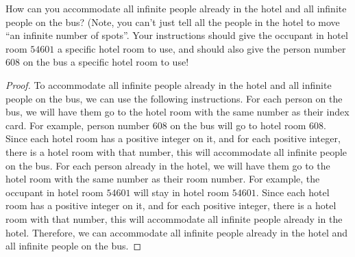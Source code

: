 \documentclass{article}
\begin{document}
\begin{enumerate}
How can you accommodate all infinite people already in the hotel and all infinite people on the bus? (Note, you can't just tell all the people in the hotel to move ``an infinite number of spots''. Your instructions should give the occupant in hotel room $54601$ a specific hotel room to use, and should also give the person number $608$ on the bus a specific hotel room to use!

\begin{proof}
    To accommodate all infinite people already in the hotel and all infinite people on the bus, we can use the following instructions. For each person on the bus, we will have them go to the hotel room with the same number as their index card. For example, person number $608$ on the bus will go to hotel room $608$. Since each hotel room has a positive integer on it, and for each positive integer, there is a hotel room with that number, this will accommodate all infinite people on the bus. For each person already in the hotel, we will have them go to the hotel room with the same number as their room number. For example, the occupant in hotel room $54601$ will stay in hotel room $54601$. Since each hotel room has a positive integer on it, and for each positive integer, there is a hotel room with that number, this will accommodate all infinite people already in the hotel. Therefore, we can accommodate all infinite people already in the hotel and all infinite people on the bus.
\end{proof}

\end{enumerate}
\end{document}
